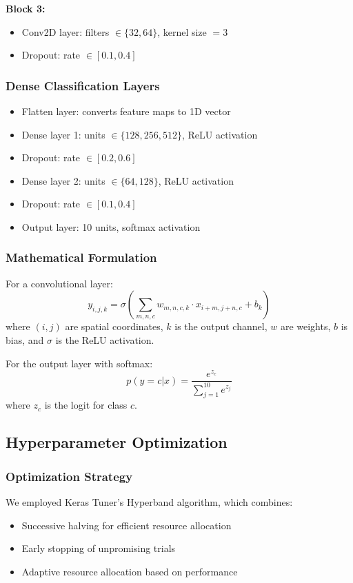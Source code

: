 \documentclass[12pt,a4paper]{article}
\begin{document}
\textbf{Block 3:}
\begin{itemize}
    \item Conv2D layer: filters $\in \{32, 64\}$, kernel size $= 3$
    \item Dropout: rate $\in [0.1, 0.4]$
\end{itemize}

\subsubsection{Dense Classification Layers}
\begin{itemize}
    \item Flatten layer: converts feature maps to 1D vector
    \item Dense layer 1: units $\in \{128, 256, 512\}$, ReLU activation
    \item Dropout: rate $\in [0.2, 0.6]$
    \item Dense layer 2: units $\in \{64, 128\}$, ReLU activation
    \item Dropout: rate $\in [0.1, 0.4]$
    \item Output layer: 10 units, softmax activation
\end{itemize}

\subsubsection{Mathematical Formulation}

For a convolutional layer:
\begin{equation}
y_{i,j,k} = \sigma\left(\sum_{m,n,c} w_{m,n,c,k} \cdot x_{i+m,j+n,c} + b_k\right)
\end{equation}
where $(i,j)$ are spatial coordinates, $k$ is the output channel, $w$ are weights, $b$ is bias, and $\sigma$ is the ReLU activation.

For the output layer with softmax:
\begin{equation}
p(y=c|x) = \frac{e^{z_c}}{\sum_{j=1}^{10} e^{z_j}}
\end{equation}
where $z_c$ is the logit for class $c$.

\subsection{Hyperparameter Optimization}

\subsubsection{Optimization Strategy}
We employed Keras Tuner's Hyperband algorithm, which combines:
\begin{itemize}
    \item Successive halving for efficient resource allocation
    \item Early stopping of unpromising trials
    \item Adaptive resource allocation based on performance
\end{itemize}
\end{document}
